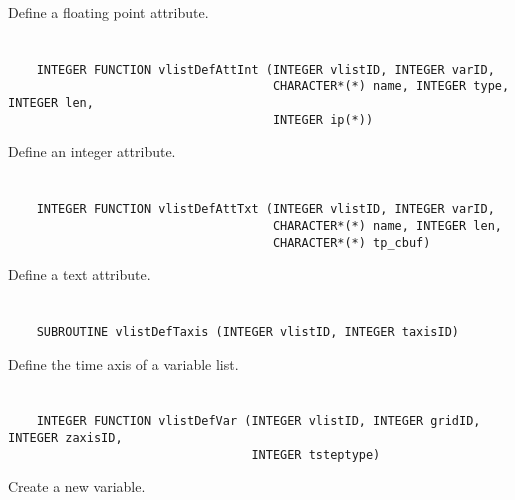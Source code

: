 Define a floating point attribute.


\section*{\tt {}}

\begin{verbatim}
    INTEGER FUNCTION vlistDefAttInt (INTEGER vlistID, INTEGER varID,
                                     CHARACTER*(*) name, INTEGER type, INTEGER len,
                                     INTEGER ip(*))
\end{verbatim}

Define an integer attribute.


\section*{\tt {}}

\begin{verbatim}
    INTEGER FUNCTION vlistDefAttTxt (INTEGER vlistID, INTEGER varID,
                                     CHARACTER*(*) name, INTEGER len,
                                     CHARACTER*(*) tp_cbuf)
\end{verbatim}

Define a text attribute.


\section*{\tt {}}

\begin{verbatim}
    SUBROUTINE vlistDefTaxis (INTEGER vlistID, INTEGER taxisID)
\end{verbatim}

Define the time axis of a variable list.


\section*{\tt {}}

\begin{verbatim}
    INTEGER FUNCTION vlistDefVar (INTEGER vlistID, INTEGER gridID, INTEGER zaxisID,
                                  INTEGER tsteptype)
\end{verbatim}

Create a new variable.


